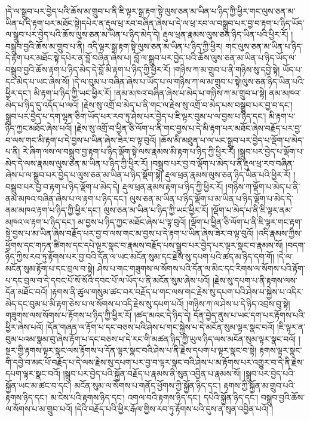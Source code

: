 །དེ་ལ་སྒྲུབ་པར་བྱེད་པའི་ཆོས་མ་གྲུབ་པ་ནི་ཇི་ལྟར་སྒྲ་རྟག་སྟེ་ལུས་ཅན་མ་ཡིན་པ་ཉིད་ཀྱི་ཕྱིར་གང་ལུས་ཅན་མ་ཡིན་པ་དེ་རྟག་པར་མཐོང་སྟེ།དཔེར་ན་རྡུལ་ཕྲ་རབ་བཞིན་ཞེས་པ་དེ་ལ་ཕྲ་རབ་ལ་བསྒྲུབ་པར་བྱ་བ་རྟག་པ་ཉིད་ཡོད་ལ་སྒྲུབ་པར་བྱེད་པའི་ཆོས་ལུས་ཅན་མ་ཡིན་པ་ཉིད་མེད་དེ། རྡུལ་ཕྲན་རྣམས་ལུས་ཅན་ཉིད་ཡིན་པའི་ཕྱིར་རོ། །བསྒྲུབ་བྱའི་ཆོས་མ་གྲུབ་པ་ནི། འདི་ལྟར་སྒྲ་རྟག་སྟེ་ལུས་ཅན་མ་ཡིན་པ་ཉིད་ཀྱི་ཕྱིར། གང་ལུས་ཅན་མ་ཡིན་པ་ཉིད་དེ་རྟག་པར་མཐོང་སྟེ་དཔེར་ན་བློ་བཞིན་ཞེས་པ། བློ་ལ་སྒྲུབ་པར་བྱེད་པའི་ཆོས་ལུས་ཅན་མ་ཡིན་པ་ཉིད་ཡོད་ལ་བསྒྲུབ་བྱའི་ཆོས་རྟག་པ་ཉིད་མེད་དེ་བློ་མི་རྟག་པ་ཉིད་ཀྱི་ཕྱིར་རོ། །གཉིས་ཀ་མ་གྲུབ་པ་ནི་གཉིས་སུ་དབྱེ་སྟེ། ཡོད་པ་དང་མེད་པ་ཡང་ཞེས་སོ། །དེ་ལ་བུམ་པ་བཞིན་ཞེས་པ་ཡོད་པ་ལ་གཉིས་ཀ་ལ་མ་གྲུབ་པ་སྟེ།ལུས་ཅན་ཉིད་ཡིན་པའི་ཕྱིར་དང་། མི་རྟག་པ་ཉིད་ཀྱི་ཡང་ཕྱིར་རོ། །ནམ་མཁའ་བཞིན་ཞེས་པ་མེད་པ་གཉིས་ཀ་མ་གྲུབ་པ་སྟེ། ནམ་མཁའ་མེད་པ་ཉིད་དུ་འདོད་པ་ལའོ། །རྗེས་སུ་འགྲོ་བ་མེད་པ་ནི་གང་ལ་རྗེས་སུ་འགྲོ་བ་མེད་པས་བསྒྲུབ་པར་བྱ་བ་དང་། སྒྲུབ་པར་བྱེད་པ་དག་ལྷན་ཅིག་ཡོད་པར་རབ་ཏུ་ཤེས་པར་བྱེད་པ་ཇི་ལྟར་བུམ་པ་ལ་བྱས་པ་ཉིད་དང་། མི་རྟག་པ་ཉིད་ཀྱང་མཐོང་ཞེས་པའོ། །རྗེས་སུ་འགྲོ་བ་ཕྱིན་ཅི་ལོག་པ་ནི་གང་བྱས་པ་དེ་མི་རྟག་པར་མཐོང་ཞེས་བརྗོད་པར་བྱ་བ་ལས་གང་མི་རྟག་པ་དེ་བྱས་པ་ཡིན་ཞེས་ཟེར་བ་ལྟ་བུའོ། །ཆོས་མི་མཐུན་པ་ལ་ཡང་སྒྲུབ་པར་བྱེད་པ་ལྡོག་པ་མེད་པ་ནི། རེ་ཞིག་ལས་ལ་བསྒྲུབ་བྱ་རྟག་པ་ཉིད་ལྡོག་སྟེ་ལས་རྣམས་མི་རྟག་པ་ཉིད་ཀྱི་ཕྱིར་རོ། །སྒྲུབ་པར་བྱེད་པ་ལྡོག་པ་མེད་དེ་ལས་རྣམས་ལུས་ཅན་མ་ཡིན་པ་ཉིད་ཀྱི་ཕྱིར་རོ། །བསྒྲུབ་པར་བྱ་བ་ལྡོག་པ་མེད་པ་ནི་རྡུལ་ཕྲ་རབ་བཞིན་ཞེས་པ་ལ་སྒྲུབ་པར་བྱེད་པ་ལུས་ཅན་མ་ཡིན་པ་ཉིད་སྡོག་སྟེ། རྡུལ་ཕྲན་རྣམས་ལུས་ཅན་ཉིད་ཡིན་པའི་ཕྱིར་རོ། །བསྒྲུབ་པར་བྱ་བ་རྟག་པ་ཉིད་ལྡོག་པ་མེད་དེ། རྡུལ་ཕྲན་རྣམས་རྟག་པ་ཉིད་ཀྱི་ཕྱིར་རོ། །གཉིས་ཀ་ལྡོག་པ་མེད་པ་ནི་ནམ་མཁའ་བཞིན་ཞེས་པ་ལ་རྟག་པ་ཉིད་དང་། ལུས་ཅན་མ་ཡིན་པ་ཉིད་ལྡོག་པ་མ་ཡིན་པ་ཉིད་ལྡོག་པ་མེད་དེ་ནམ་མཁའ་རྟག་པ་ཉིད་ཀྱི་ཕྱིར་དང་། ལུས་ཅན་མ་ཡིན་པ་ཉིད་ཀྱི་ཡང་ཕྱིར་རོ། །ལྡོག་པ་མེད་པ་ནི་ཇི་ལྟར་ནམ་མཁའ་ལ་རྟག་པ་ཉིད་དང་། མ་བྱས་པ་ཉིད་ཀྱང་མཐོང་ཞེས་པ་ལྟ་བུའོ། །ལྡོག་པ་ཕྱིན་ཅི་ལོག་པ་ནི་ཇི་ལྟར་གང་རྟག་སྟེ་བྱས་པ་མ་ཡིན་ཞེས་བརྗོད་པར་བྱ་བ་ལས་གང་མ་བྱས་པ་དེ་རྟག་པ་ཡིན་ཞེས་ཟེར་བ་ལྟ་བུའོ། །འདི་རྣམས་ཀྱིས་ཕྱོགས་དང་གཏན་ཚིགས་དང་དཔེ་ལྟར་སྣང་བ་རྣམས་བརྗོད་པས་སྒྲུབ་པར་བྱེད་པར་ལྟར་སྣང་བ་རྣམས་སོ། །བདག་ཉིད་ཀྱིས་རབ་ཏུ་རྟོགས་པར་བྱ་བའི་དོན་ལ་ཡང་མངོན་སུམ་དང་རྗེས་སུ་དཔག་པའི་ཚད་མ་ཉིད་དག་གོ། །དེ་ལ་མངོན་སུམ་རྟོག་པ་དང་བྲལ་བ་སྟེ། ཤེས་པ་གང་གཟུགས་ལ་སོགས་པའི་དོན་ལ་མིང་དང་རིགས་ལ་སོགས་པའི་རྟོག་པ་དང་བྲལ་བ་དེ་དབང་པོ་སོ་སོའི་དབང་པོ་ལ་ཡོད་པ་ནི་མངོན་སུམ་ཞེས་པའོ། །རྗེས་སུ་དཔག་པ་ནི་རྟགས་ལས་དོན་མཐོང་བའོ། །རྟགས་ནི་ཚུལ་གསུམ་ཚང་བར་བརྗོད་པ་གང་ལས་གང་རྗེས་སུ་དཔག་པའི་ཤེས་པ་སྐྱེས་པ་འདིར་མེད་དང་བུམ་པ་མི་རྟག་ཅེས་པ་ལ་སོགས་པ་འདི་རྗེས་སུ་དཔག་པའོ། །གཉིས་ཀ་ལ་ཤེས་པ་དེ་ཉིད་འབྲས་བུ་སྟེ། གཟུགས་ལས་སོགས་པ་རྟོགས་པ་ཉིད་ཀྱི་ཕྱིར་རོ། །ཚད་མའང་དེ་ཉིད་དེ། དོན་བྱེད་ནུས་པ་ཡང་དག་པར་རྟོགས་པའི་ཕྱིར་ཞེས་པའོ། །དོན་གཞན་ལ་རྟོག་པ་དང་བཅས་པའི་ཤེས་པ་གང་སྐྱེས་པ་དེ་མངོན་སུམ་ལྟར་སྣང་བའོ། །ཇི་ལྟར་ན་བུམ་པའམ་སྣམ་བུ་ཞེས་རྟོག་པ་དང་བཅས་པ་དེ་རང་གི་མཚན་ཉིད་ཀྱི་ཡུལ་ཉིད་ལས་མངོན་སུམ་ལྟར་སྣང་བའོ། །སྔར་གྱི་རྟགས་ལྟར་སྣང་ལས་རྟོགས་པ་དོན་ལྟར་སྣང་བའི་ཤེས་པ་ནི་རྗེས་དཔག་པ་ལྟར་སྣང་བ་སྟེ། རྟགས་ལྟར་སྣང་གི་དབྱེ་བ་མང་པོ་བརྗོད་པ་དེ་ལས་རྗེས་སུ་དཔག་པར་བྱ་བ་ལྟར་སྣང་བའི་ཤེས་པ་མ་རྟོགས་པར་འགྱུར་བ་དེ་ནི་རྗེས་དཔག་ལྟར་སྣང་བའོ། །སྒྲུབ་པར་བྱེད་པའི་སྐྱོན་བརྗོད་པ་རྣམས་ནི་སུན་འབྱིན་པ་རྣམས་སོ། །སྒྲུབ་པར་བྱེད་པའི་སྐྱོན་ཡང་མ་ཚང་བ་དང་། མངོན་སུམ་ལ་སོགས་པ་གནོད་ཕྱོགས་ཀྱི་སྐྱོན་ཉིད་དང་། རྟགས་ཀྱི་སྐྱོན་མ་གྲུབ་པའི་རྟགས་ཉིད་དང་། མ་ངེས་པའི་རྟགས་ཉིད་དང་། འགལ་བའི་རྟགས་ཉིད་དང་། དཔེའི་སྐྱོན་ཉིད་དང་། བསྒྲུབ་བྱའི་ཆོས་ལ་སོགས་པ་མ་གྲུབ་པའོ། །དེའི་བརྗོད་པའི་ཕྱིར་རྒོལ་གྱིས་རབ་ཏུ་རྟོགས་པའི་དུས་ན་སུན་འབྱིན་པའོ། །
